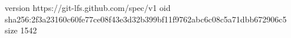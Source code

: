 version https://git-lfs.github.com/spec/v1
oid sha256:2f3a23160c60fe77ce08f43e3d32b399bf11f9762abc6c08c5a71dbb672906c5
size 1542
